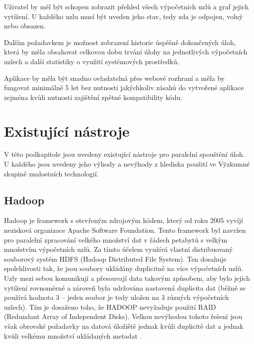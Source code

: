 Uživatel by měl být schopen zobrazit přehled všech výpočetních uzlů a graf jejich vytížení. U každého uzlu musí být uveden jeho stav, tedy zda je odpojen, volný nebo obsazen. 

Dalším požadavkem je možnost zobrazení historie úspěšně dokončených úloh, která by měla obsahovat celkovou dobu trvání úlohy na jednotlivých výpočetních uzlech a další statistiky o využití systémových prostředků.

Aplikace by měla být snadno ovladatelná přes webové rozhraní a měla by fungovat minimálně 5 let bez nutnosti jakýchkoliv zásahů do vytvořené aplikace zejména kvůli nutnosti zajištění zpětné kompatibility kódu.

\section{Existující nástroje}

V této podkapitole jsou uvedeny existující nástroje pro paralelní spouštění úloh. U každého jsou uvedeny jeho výhody a nevýhody z hlediska použití ve Výzkumné skupině znalostních technologií.

\subsection*{Hadoop}

Hadoop je framework s otevřeným zdrojovým kódem, který od roku 2005 vyvíjí nezisková organizace Apache Software Foundation. Tento framework byl navržen pro paralelní zpracování velkého množství dat v řádech petabytů s velkým množstvím výpočetních uzlů. Za tímto účelem využívá vlastní distribuovaný souborový systém HDFS (Hadoop Distributed File System). Ten dosahuje spolehlivosti tak, že jsou soubory ukládány duplicitně na více výpočetních uzlů. Uzly mezi sebou komunikují a přesouvají data takovým způsobem, aby bylo jejich vytížení rovnoměrné a zároveň byla udržována nastavená duplicita dat (běžně se používá hodnota 3 -- jeden soubor je tedy uložen na 3 různých výpočetních uzlech). Tím je dosaženo toho, že HADOOP nevyžaduje použití RAID (Redundant Array of Independent Disks). Velkou nevýhodou tohoto řešení jsou však obrovské požadavky na datová úložiště jednak kvůli duplicitě dat a jednak kvůli velkému množství ukládaných metadat \cite{existTools_Hadoop}.

